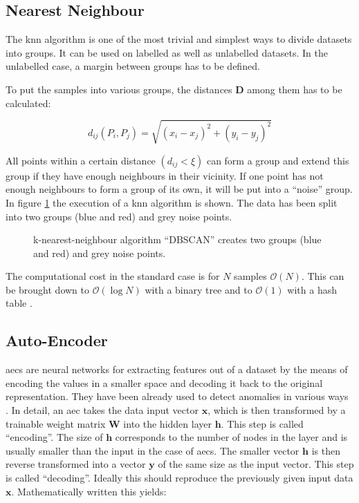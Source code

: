 	\subsection{Nearest Neighbour}
	The \ac{knn} algorithm \cite[p. 168ff]{ai-example} is one of the most trivial and simplest ways to divide datasets into groups. It can be used on labelled as well as unlabelled datasets. In the unlabelled case, a margin between groups has to be defined. 
	
\bigbreak

To put the samples into various groups, the distances $\mathbf{D}$ among them has to be calculated:

\begin{equation*}
d_{ij} (P_i, P_j) = \sqrt{(x_i - x_j)^2 + (y_i - y_j)^2}
\end{equation*}	

All points within a certain distance $\left( d_{ij} < \xi \right)$ can form a group and extend this group if they have enough neighbours in their vicinity. If one point has not enough neighbours to form a group of its own, it will be put into a \enquote{noise} group. In figure \ref{f:3_DBSCAN} the execution of a \ac{knn} algorithm is shown. The data has been split into two groups (blue and red) and grey noise points.

\begin{figure}[H]
\centering

\caption{k-nearest-neighbour algorithm \enquote{DBSCAN} creates two groups (blue and red) and grey noise points.}
\label{f:3_DBSCAN}
\end{figure}
	
	The computational cost in the standard case is for $N$ samples $\mathcal{O} (N)$. This can be brought down to $\mathcal{O} (\log N)$ with a binary tree and to $\mathcal{O} (1)$ with a hash table \cite[p. 739]{ai-modern}.	


	\subsection{Auto-Encoder}
	\acfp{aec} are neural networks for extracting features out of a dataset by the means of encoding the values in a smaller space and decoding it back to the original representation. They have been already used to detect anomalies in various ways \cite{auto-enc-1}\cite{auto-enc-2}\cite{anomaly-basic}. \newline	
	In detail, an \ac{aec} takes the data input vector $\mathbf{x}$, which is then transformed by a trainable weight matrix $\mathbf{W}$ into the hidden layer $\mathbf{h}$. This step is called \enquote{encoding}. The size of $\mathbf{h}$ corresponds to the number of nodes in the layer and is usually smaller than the input in the case of \acp{aec}. The smaller vector $\mathbf{h}$ is then reverse transformed into a vector $\mathbf{y}$ of the same size as the input vector. This step is called \enquote{decoding}. Ideally this should reproduce the previously given input data $\mathbf{x}$. Mathematically written this yields:
	
